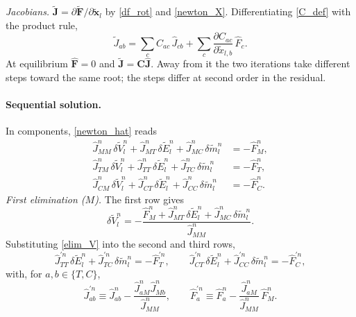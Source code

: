 \emph{Jacobians.} $\tilde{\boldsymbol{J}}=\partial\tilde{\boldsymbol{F}}/\partial\tilde{\boldsymbol{x}}_l$ by \eqref{df_rot} and \eqref{newton_X}. Differentiating \eqref{C_def} with the product rule,
\begin{equation}\label{J_rel}
\tilde{J}_{ab}=\sum_cC_{ac}\,\hat{J}_{cb}+\sum_c\frac{\partial C_{ac}}{\partial\tilde{x}_{l,b}}\,\hat{F}_c .
\end{equation}
At equilibrium $\hat{\boldsymbol{F}}=0$ and $\tilde{\boldsymbol{J}}=\boldsymbol{C}\hat{\boldsymbol{J}}$. Away from it the two iterations take different steps toward the same root; the steps differ at second order in the residual.

\paragraph{Sequential solution.}
In components, \eqref{newton_hat} reads
\begin{equation}\label{newton_rows}
\begin{aligned}
\hat{J}^n_{MM}\,\delta\tilde{V}_l^n+\hat{J}^n_{MT}\,\delta\tilde{E}_l^n+\hat{J}^n_{MC}\,\delta\tilde{m}_l^n&=-\hat{F}_M^n,\\
\hat{J}^n_{TM}\,\delta\tilde{V}_l^n+\hat{J}^n_{TT}\,\delta\tilde{E}_l^n+\hat{J}^n_{TC}\,\delta\tilde{m}_l^n&=-\hat{F}_T^n,\\
\hat{J}^n_{CM}\,\delta\tilde{V}_l^n+\hat{J}^n_{CT}\,\delta\tilde{E}_l^n+\hat{J}^n_{CC}\,\delta\tilde{m}_l^n&=-\hat{F}_C^n.
\end{aligned}
\end{equation}
\emph{First elimination ($M$).} The first row gives
\begin{equation}\label{elim_V}
\delta\tilde{V}_l^n=-\frac{\hat{F}_M^n+\hat{J}^n_{MT}\,\delta\tilde{E}_l^n+\hat{J}^n_{MC}\,\delta\tilde{m}_l^n}{\hat{J}^n_{MM}}.
\end{equation}
Substituting \eqref{elim_V} into the second and third rows,
\begin{equation}\label{rows_TC}
\hat{J}^{\prime n}_{TT}\,\delta\tilde{E}_l^n+\hat{J}^{\prime n}_{TC}\,\delta\tilde{m}_l^n=-\hat{F}^{\prime n}_T,\qquad
\hat{J}^{\prime n}_{CT}\,\delta\tilde{E}_l^n+\hat{J}^{\prime n}_{CC}\,\delta\tilde{m}_l^n=-\hat{F}^{\prime n}_C,
\end{equation}
with, for $a,b\in\{T,C\}$,
\begin{equation}\label{schur_1}
\hat{J}^{\prime n}_{ab}\equiv\hat{J}^n_{ab}-\frac{\hat{J}^n_{aM}\hat{J}^n_{Mb}}{\hat{J}^n_{MM}},\qquad \hat{F}^{\prime n}_a\equiv \hat{F}^n_a-\frac{\hat{J}^n_{aM}}{\hat{J}^n_{MM}}\,\hat{F}^n_M .
\end{equation}
